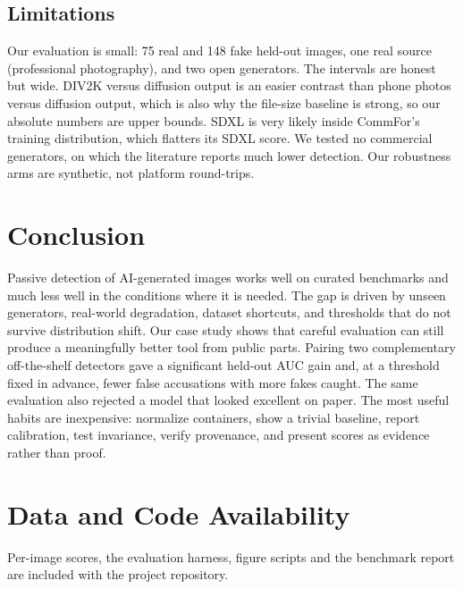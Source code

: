 \documentclass[conference]{IEEEtran}
\begin{document}
\subsection{Limitations}
Our evaluation is small: 75 real and 148 fake held-out images, one real
source (professional photography), and two open generators. The intervals
are honest but wide. DIV2K versus diffusion output is an easier contrast
than phone photos versus diffusion output, which is also why the file-size
baseline is strong, so our absolute numbers are upper bounds. SDXL is very
likely inside CommFor's training distribution, which flatters its SDXL
score. We tested no commercial generators, on which the literature reports
much lower detection. Our robustness arms are synthetic, not platform
round-trips.

\section{Conclusion}
Passive detection of AI-generated images works well on curated benchmarks
and much less well in the conditions where it is needed. The gap is driven
by unseen generators, real-world degradation, dataset shortcuts, and
thresholds that do not survive distribution shift. Our case study shows
that careful evaluation can still produce a meaningfully better tool from
public parts. Pairing two complementary off-the-shelf detectors gave a
significant held-out AUC gain and, at a threshold fixed in advance, fewer
false accusations with more fakes caught. The same evaluation also rejected
a model that looked excellent on paper. The most useful habits are
inexpensive: normalize containers, show a trivial baseline, report
calibration, test invariance, verify provenance, and present scores as
evidence rather than proof.

\section*{Data and Code Availability}
Per-image scores, the evaluation harness, figure scripts and the benchmark
report are included with the project repository.



\end{document}
